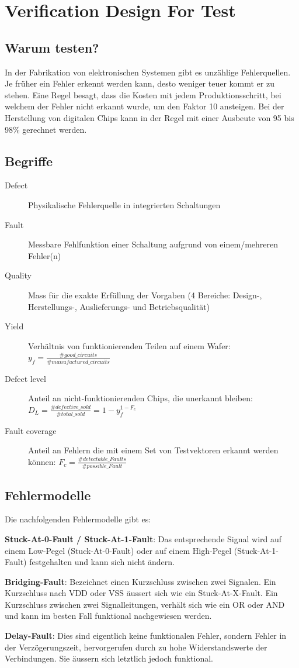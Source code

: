 \section{Verification Design For Test}
\subsection{Warum testen?}
In der Fabrikation von elektronischen Systemen gibt es unzählige Fehlerquellen. Je früher ein Fehler erkennt werden kann, desto weniger teuer kommt er zu stehen. Eine Regel besagt, dass die Kosten mit jedem Produktionsschritt, bei welchem der Fehler nicht erkannt wurde, um den Faktor 10 ansteigen. Bei der Herstellung von digitalen Chips kann in der Regel mit einer Ausbeute von 95 bis 98\% gerechnet werden.

\subsection{Begriffe}
\begin{description}
  \item[Defect] Physikalische Fehlerquelle in integrierten Schaltungen
  \item[Fault] Messbare Fehlfunktion einer Schaltung aufgrund von einem/mehreren Fehler(n)
  \item[Quality] Mass für die exakte Erfüllung der Vorgaben (4 Bereiche: Design-, Herstellungs-, Auslieferungs- und Betriebsqualität)
  \item[Yield] Verhältnis von funktionierenden Teilen auf einem Wafer: $y_f = \frac{\#good\_circuits}{\#manufactured\_circuits}$
  \item[Defect level] Anteil an nicht-funktionierenden Chips, die unerkannt bleiben: $D_L = \frac{\#defective\_sold}{\#total\_sold} = 1 - y_f^{1-F_c}$
  \item[Fault coverage] Anteil an Fehlern die mit einem Set von Testvektoren erkannt werden können: $F_c = \frac{\#detectable\_Faults}{\#possible\_Fault}$
\end{description}


\subsection{Fehlermodelle}
Die nachfolgenden Fehlermodelle gibt es:
\begin{compactitem}
    \item \textbf{Stuck-At-0-Fault / Stuck-At-1-Fault}: Das entsprechende Signal wird auf einem Low-Pegel (Stuck-At-0-Fault) oder auf einem High-Pegel (Stuck-At-1-Fault) festgehalten und kann sich nicht ändern.
    \item \textbf{Bridging-Fault}: Bezeichnet einen Kurzschluss zwischen zwei Signalen. Ein Kurzschluss nach VDD oder VSS äussert sich wie ein Stuck-At-X-Fault. Ein Kurzschluss zwischen zwei Signalleitungen, verhält sich wie ein OR oder AND und kann im besten Fall funktional nachgewiesen werden.
    \item \textbf{Delay-Fault}: Dies sind eigentlich keine funktionalen Fehler, sondern Fehler in der Verzögerungszeit, hervorgerufen durch zu hohe Widerstandswerte der Verbindungen. Sie äussern sich letztlich jedoch funktional.
\end{compactitem}

